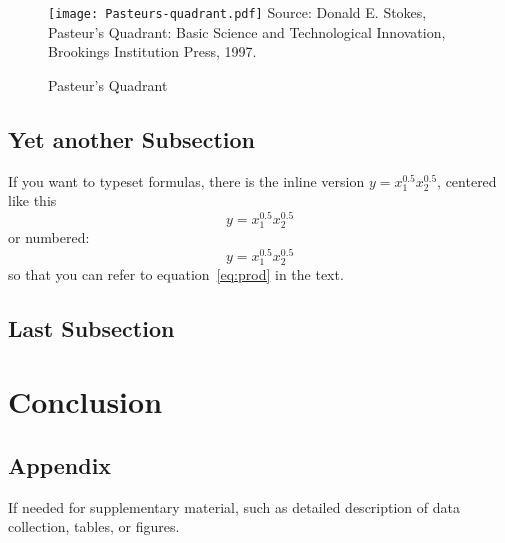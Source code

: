 \documentclass{micro-econ-thesis}
\begin{document}
\begin{figure}[ht]
  \centering
	\texttt{[image: Pasteurs-quadrant.pdf]}
  {\small\flushleft Source: Donald E. Stokes, Pasteur's Quadrant: Basic Science and Technological Innovation, Brookings Institution Press, 1997.}
  \caption{Pasteur's Quadrant}   
    \label{fig:pasteur}
\end{figure}  

\subsection{Yet another Subsection}
\label{subsec:yetanother}

If you want to typeset formulas, there is the inline version $ y = x_1^{0.5} x_2^{0.5}$, centered like this
\[
y = x_1^{0.5} x_2^{0.5}
\]
or numbered:
\begin{equation}\label{eq:prod}
y = x_1^{0.5} x_2^{0.5}	
\end{equation}
 so that you can refer to equation~\ref{eq:prod} in the text.

\subsection{Last Subsection}
\label{subsec:last}

\section{Conclusion}


\cleardoublepage
{}
{} %
\printbibliography

\cleardoublepage
\begin{appendix}
\section{Appendix}
If needed for supplementary material, such as detailed description of data collection, tables, or figures.

\end{appendix}

\makeThesisDeclaration
\end{document}
